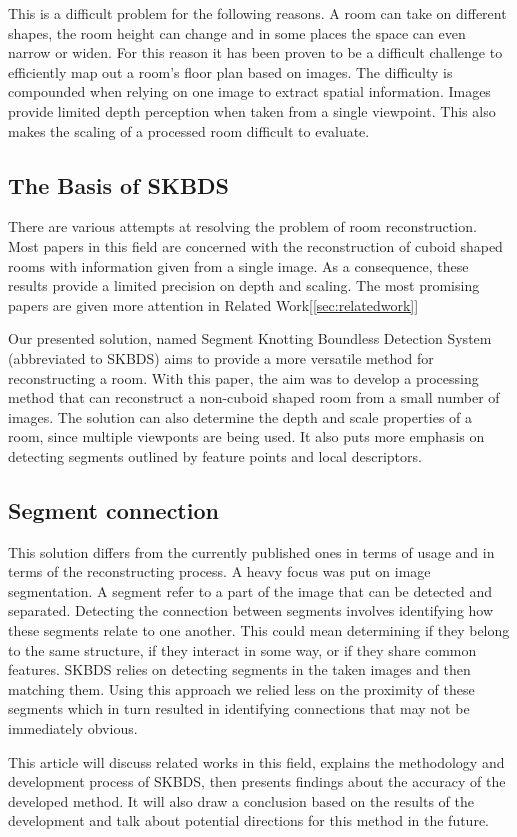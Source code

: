 This is a difficult problem for the following reasons. A room can take on different shapes, the room height can change and in some places the space can even narrow or widen. For this reason it has been proven to be a difficult challenge to efficiently map out a room's floor plan based on images. The difficulty is compounded when relying on one image to extract spatial information. Images provide limited depth perception when taken from a single viewpoint. This also makes the scaling of a processed room difficult to evaluate.


\subsection{The Basis of SKBDS} %
There are various attempts at resolving the problem of room reconstruction. Most papers in this field are concerned with the reconstruction of cuboid shaped rooms with information given from a single image. As a consequence, these results provide a limited precision on depth and scaling. The most promising papers are given more attention in Related Work[\ref{sec:relatedwork}]

Our presented solution, named Segment Knotting Boundless Detection System (abbreviated to SKBDS) aims to provide a more versatile method for reconstructing a room. With this paper, the aim was to develop a processing method that can reconstruct a non-cuboid shaped room from a small number of images. The solution can also determine the depth and scale properties of a room, since multiple viewponts are being used. It also puts more emphasis on detecting segments outlined by feature points and local descriptors. 



\subsection{Segment connection} %
This solution differs from the currently published ones in terms of usage and in terms of the reconstructing process. A heavy focus was put on image segmentation. A segment refer to a part of the image that can be detected and separated. Detecting the connection between segments involves identifying how these segments relate to one another. This could mean determining if they belong to the same structure, if they interact in some way, or if they share common features. SKBDS relies on detecting segments in the taken images and then matching them. Using this approach we relied less on the proximity of these segments which in turn resulted in identifying connections that may not be immediately obvious.

This article will discuss related works in this field, explains the methodology and development process of SKBDS, then presents findings about the accuracy of the developed method. It will also draw a conclusion based on the results of the development and talk about potential directions for this method in the future.




